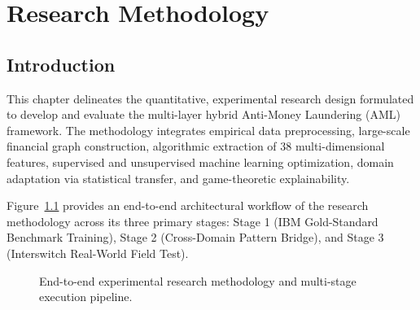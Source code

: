 \chapter{Research Methodology} \label{ch:methodology}

\section{Introduction}
This chapter delineates the quantitative, experimental research design formulated to develop and evaluate the multi-layer hybrid Anti-Money Laundering (AML) framework. The methodology integrates empirical data preprocessing, large-scale financial graph construction, algorithmic extraction of 38 multi-dimensional features, supervised and unsupervised machine learning optimization, domain adaptation via statistical transfer, and game-theoretic explainability. 

Figure~\ref{fig:methodology_pipeline} provides an end-to-end architectural workflow of the research methodology across its three primary stages: Stage 1 (IBM Gold-Standard Benchmark Training), Stage 2 (Cross-Domain Pattern Bridge), and Stage 3 (Interswitch Real-World Field Test).

\begin{figure}[hbt!]
\centering
{}
\caption{End-to-end experimental research methodology and multi-stage execution pipeline.}
\label{fig:methodology_pipeline}
\end{figure}

